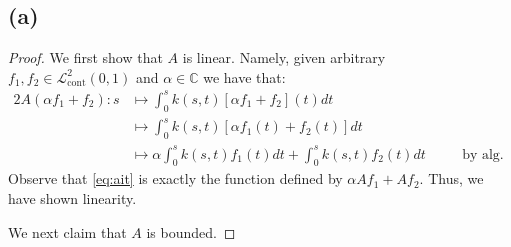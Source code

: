 \documentclass[10pt]{article}
\begin{document}
\subsection*{(a)}
\begin{proof}
    We first show that $A$ is linear. Namely, given arbitrary $f_1, f_2 \in \mathcal{L}^2_{\text{cont}}(0,1)$ and $
    \alpha\in\mathbb{C}$ we have that:
    \begin{alignat}{2}
        A(\alpha f_1 + f_2): s &\mapsto \int_{0}^{s}k(s,t)[\alpha f_1 + f_2](t)dt \nonumber\\
        &\mapsto \int_{0}^{s}k(s,t)[\alpha f_1(t) + f_2(t)]dt \nonumber\\
        &\mapsto \alpha \int_{0}^{s}k(s,t)f_1(t)dt + \int_{0}^{s}k(s,t)f_2(t)dt \quad&&\text{by alg. int. theorems.}\label{eq:ait}
    \end{alignat}
    Observe that \eqref{eq:ait} is exactly the function defined by $\alpha Af_1 + Af_2.$ Thus, we have shown linearity.

    We next claim that $A$ is bounded.
\end{proof}
\end{document}
